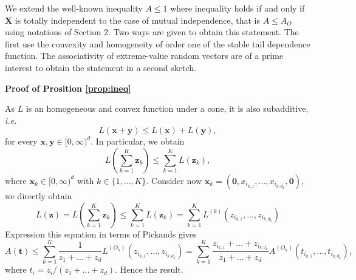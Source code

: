 \documentclass[11pt]{article}
\makeatletter
\theoremstyle{definition}
\renewenvironment{proof}[1][\proofname]{\par
\pushQED{\qed}%
\normalfont \topsep6\p@\@plus6\p@\relax
\trivlist
\item\relax
{\textbf{
#1\@addpunct{ }}}\hspace\labelsep\ignorespaces
}{%
\popQED\endtrivlist\@endpefalse
}
\makeatother
\begin{document}
	We extend the well-known inequality $A \leq 1$ where inequality holds if and only if $\textbf{X}$ is totally independent to the case of mutual independence, that is $A \leq A_{O}$ using notations of Section 2. Two ways are given to obtain this statement. The first use the convexity and homogeneity of order one of the stable tail dependence function. The associativity of extreme-value random vectors are of a prime interest to obtain the statement in a second sketch.
	
	\begin{proof}[Proof of Prosition \ref{prop:ineq}]
		As $L$ is an homogeneous and convex function under a cone, it is also subadditive, \emph{i.e.} $$L(\textbf{x} + \textbf{y}) \leq L(\textbf{x}) + L(\textbf{y}),$$ for every $\textbf{x}, \textbf{y} \in [0, \infty)^d$. In particular, we obtain $$L(\sum_{k=1}^K \textbf{z}_k) \leq \sum_{k=1}^K L(\textbf{z}_k),$$ where $\textbf{x}_k \in [0, \infty)^d$ with $k \in \{1,\dots, K\}$. Consider now $\textbf{x}_k = (\textbf{0}, x_{i_{k,1}}, \dots, x_{i_{k,d_k}}, \textbf{0})$, we directly obtain
	\begin{equation*}
		L(\textbf{z}) = L(\sum_{k=1}^K \textbf{z}_k) \leq \sum_{k=1}^K L(\textbf{z}_k) = \sum_{k=1}^K L^{(k)} (z_{i_{k,1}}, \dots, z_{i_{k,d_k}})
	\end{equation*}
	Expression this equation in terms of Pickands gives
	\begin{equation*}
		A(\textbf{t}) \leq \sum_{k=1}^K \frac{1}{z_1 + \dots + z_d} L^{(O_k)}(z_{i_{k,1}}, \dots, z_{i_{k,d_k}}) = \sum_{k=1}^K \frac{z_{i_{k,1}} + \dots + z_{i_{k,d_k}}}{z_1 + \dots + z_d} A^{(O_k)}(t_{i_{k,1}}, \dots, t_{i_{k,d_k}}),
	\end{equation*}
	where $t_i = z_i / (z_1 + \dots + z_d)$. Hence the result.
	

\end{proof}
\end{document}
